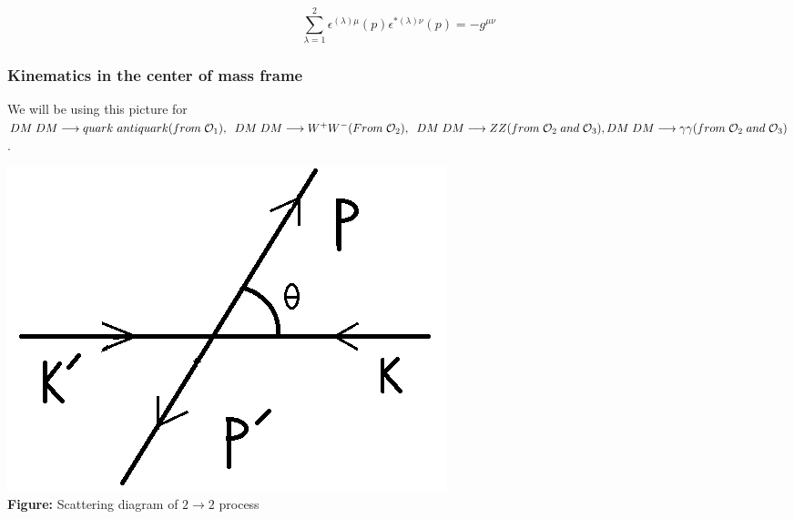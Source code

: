 \documentclass[12pt]{report}
\begin{document}
$$\sum_{\lambda=1}^2 \epsilon^{(\lambda) \mu}(p) \epsilon^{*(\lambda) \nu}(p) = - g^{\mu \nu}$$











\subsubsection{Kinematics in the center of mass frame}

We will be using this picture for $ DM\;DM \longrightarrow quark\ antiquark (from\; \mathcal{O}_1 ), \\ \; \; DM\; DM \longrightarrow W^+W^-(From\; \mathcal{O}_2 ), \; \; DM\; DM \longrightarrow ZZ (from\; \mathcal{O}_2 \; and\; \mathcal{O}_3 ), \;\\ DM\; DM \longrightarrow \gamma  \gamma (from\; \mathcal{O}_2  \; and\; \mathcal{O}_3 )$ .


\begin{center}
\includegraphics[scale=0.3]{kinematics.png}\\
\textbf{Figure:} Scattering diagram of $2 \longrightarrow 2$ process
\end{center}
\end{document}
